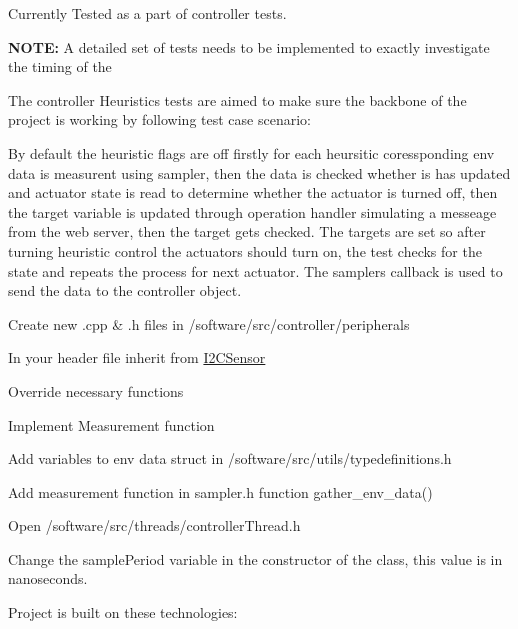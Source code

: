 Currently Tested as a part of controller tests.

{\bfseries N\+O\+TE\+:} A detailed set of tests needs to be implemented to exactly investigate the timing of the

The controller Heuristics tests are aimed to make sure the backbone of the project is working by following test case scenario\+:

By default the heuristic flags are off firstly for each heursitic coressponding env data is measurent using sampler, then the data is checked whether is has updated and actuator state is read to determine whether the actuator is turned off, then the target variable is updated through operation handler simulating a messeage from the web server, then the target gets checked. The targets are set so after turning heuristic control the actuators should turn on, the test checks for the state and repeats the process for next actuator. The samplers callback is used to send the data to the controller object.


\begin{DoxyEnumerate}
\item Create new .cpp \& .h files in /software/src/controller/peripherals
\item In your header file inherit from \hyperlink{classI2CSensor}{I2\+C\+Sensor}
\item Override necessary functions
\item Implement Measurement function
\item Add variables to env data struct in /software/src/utils/typedefinitions.h
\item Add measurement function in sampler.\+h function gather\+\_\+env\+\_\+data()
\end{DoxyEnumerate}


\begin{DoxyEnumerate}
\item Open /software/src/threads/controller\+Thread.h
\item Change the sample\+Period variable in the constructor of the class, this value is in nanoseconds.
\end{DoxyEnumerate}

Project is built on these technologies\+:


